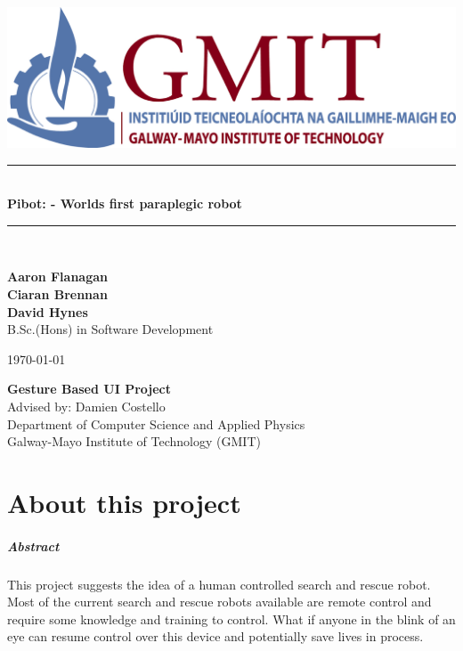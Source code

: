 \documentclass[12pt,a4paper,oneside,openany]{book}
\newcommand{\projecttitle}{Pibot: - Worlds first paraplegic robot}
\newcommand{\projectauthor}{Aaron Flanagan \\[0.2cm] Ciaran Brennan \\[0.2cm] David Hynes}
\newcommand{\projectadvisor}{Damien Costello}
\newcommand{\projectprogramme}{B.Sc.(Hons) in Software Development}
\newcommand{\projectdate}{\today}
\begin{document}
\begin{titlepage}
	\begin{center}
		\includegraphics{gmit-logo.jpg}
	\end{center}
	\begin{minipage}[t][6cm]{\textwidth}
		\centering
		\rule{\linewidth}{0.5mm} \\[0.4cm]
		{ \LARGE \bfseries \projecttitle \\[0.4cm] }
		\rule{\linewidth}{0.5mm} \\[0.8cm]
	\end{minipage}
	
	\begin{minipage}[t][6.5cm]{\textwidth}
		\centering
		\textbf{\projectauthor}\\[0.5cm]
		\projectprogramme
	\end{minipage}
	
	\begin{minipage}[t][1cm]{\textwidth}
		\centering
		\textsc{\projectdate}
	\end{minipage}
	
	\begin{minipage}[t][3cm]{\textwidth}
		\centering
		\textbf{Gesture Based UI Project}\\[0.3cm]
		Advised by: \projectadvisor \\[0.1cm]
		Department of Computer Science and Applied Physics\\
		Galway-Mayo Institute of Technology (GMIT)
	\end{minipage}
\end{titlepage}

\chapter*{About this project}

\paragraph{Abstract}
This project suggests the idea of a human controlled search and rescue robot. Most of the current search and rescue robots available are remote control and require some knowledge and training to control. What if anyone in the blink of an eye can resume control over this device and potentially save lives in process.
\end{document}
